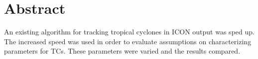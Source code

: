 
 \setcounter{tocdepth}{2}
 \tableofcontents



\chapter*{Abstract}

An existing algorithm for tracking tropical cyclones in ICON output was sped up. The increased speed was used in order to evaluate assumptions on characterizing parameters for TCs. These parameters were varied and the results compared.
